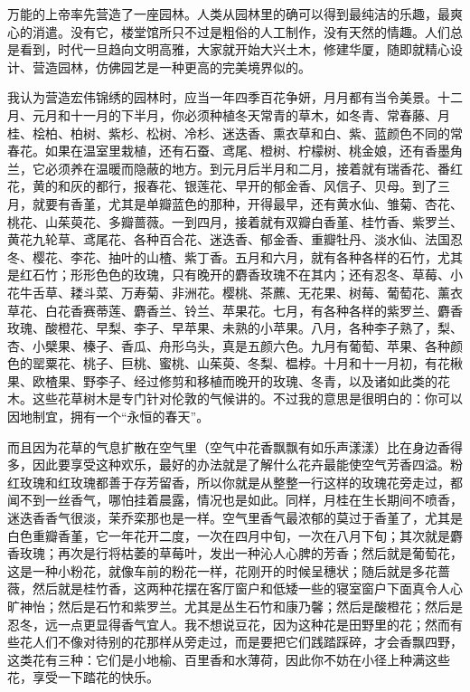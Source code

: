 \par 万能的上帝率先营造了一座园林。人类从园林里的确可以得到最纯洁的乐趣，最爽心的消遣。没有它，楼堂馆所只不过是粗俗的人工制作，没有天然的情趣。人们总是看到，时代一旦趋向文明高雅，大家就开始大兴土木，修建华厦，随即就精心设计、营造园林，仿佛园艺是一种更高的完美境界似的。
\par 我认为营造宏伟锦绣的园林时，应当一年四季百花争妍，月月都有当令美景。十二月、元月和十一月的下半月，你必须种植冬天常青的草木，如冬青、常春藤、月桂、桧柏、柏树、紫杉、松树、冷杉、迷迭香、熏衣草和白、紫、蓝颜色不同的常春花。如果在温室里栽植，还有石蚕、鸢尾、橙树、柠檬树、桃金娘，还有香墨角兰，它必须养在温暖而隐蔽的地方。到元月后半月和二月，接着就有瑞香花、番红花，黄的和灰的都行，报春花、银莲花、早开的郁金香、风信子、贝母。到了三月，就要有香堇，尤其是单瓣蓝色的那种，开得最早，还有黄水仙、雏菊、杏花、桃花、山茱萸花、多瓣蔷薇。一到四月，接着就有双瓣白香堇、桂竹香、紫罗兰、黄花九轮草、鸢尾花、各种百合花、迷迭香、郁金香、重瓣牡丹、淡水仙、法国忍冬、樱花、李花、抽叶的山楂、紫丁香。五月和六月，就有各种各样的石竹，尤其是红石竹；形形色色的玫瑰，只有晚开的麝香玫瑰不在其内；还有忍冬、草莓、小花牛舌草、耧斗菜、万寿菊、非洲花。樱桃、茶藨、无花果、树莓、葡萄花、薰衣草花、白花香赛蒂莲、麝香兰、铃兰、苹果花。七月，有各种各样的紫罗兰、麝香玫瑰、酸橙花、早梨、李子、早苹果、未熟的小苹果。八月，各种李子熟了，梨、杏、小檗果、榛子、香瓜、舟形乌头，真是五颜六色。九月有葡萄、苹果、各种颜色的罂粟花、桃子、巨桃、蜜桃、山茱萸、冬梨、榅桲。十月和十一月初，有花楸果、欧楂果、野李子、经过修剪和移植而晚开的玫瑰、冬青，以及诸如此类的花木。这些花草树木是专门针对伦敦的气候讲的。不过我的意思是很明白的：你可以因地制宜，拥有一个“永恒的春天”。
\par 而且因为花草的气息扩散在空气里（空气中花香飘飘有如乐声漾漾）比在身边香得多，因此要享受这种欢乐，最好的办法就是了解什么花卉最能使空气芳香四溢。粉红玫瑰和红玫瑰都善于存芳留香，所以你就是从整整一行这样的玫瑰花旁走过，都闻不到一丝香气，哪怕挂着晨露，情况也是如此。同样，月桂在生长期间不喷香，迷迭香香气很淡，茉乔栾那也是一样。空气里香气最浓郁的莫过于香堇了，尤其是白色重瓣香堇，它一年花开二度，一次在四月中旬，一次在八月下旬；其次就是麝香玫瑰；再次是行将枯萎的草莓叶，发出一种沁人心脾的芳香；然后就是葡萄花，这是一种小粉花，就像车前的粉花一样，花刚开的时候呈穗状；随后就是多花蔷薇，然后就是桂竹香，这两种花摆在客厅窗户和低矮一些的寝室窗户下面真令人心旷神怡；然后是石竹和紫罗兰。尤其是丛生石竹和康乃馨；然后是酸橙花；然后是忍冬，远一点更显得香气宜人。我不想说豆花，因为这种花是田野里的花；然而有些花人们不像对待别的花那样从旁走过，而是要把它们践踏踩碎，才会香飘四野，这类花有三种：它们是小地榆、百里香和水薄荷，因此你不妨在小径上种满这些花，享受一下踏花的快乐。
